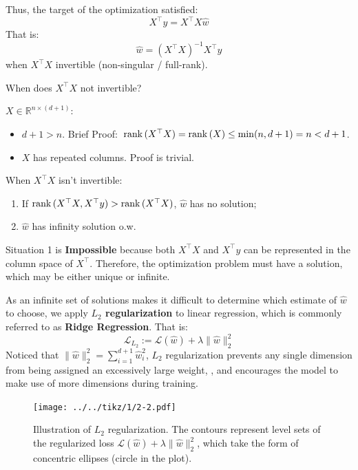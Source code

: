 \documentclass[../main]{subfiles}
\begin{document}
Thus, the target of the optimization satisfied:
\begin{equation}
    X^\top y=X^\top X\hat w
\end{equation}
That is:
\begin{equation}
    \hat w=(X^\top X)^{-1}X^\top y
\end{equation}
when $X^\top X$ invertible (non-singular / full-rank).
\begin{example}
  When does $X^\top X$ not invertible?
\end{example}
\begin{solution}
  $X\in \mathbb R^{n\times(d+1)}$:
\begin{itemize}
  \item $d+1>n.$ Brief Proof: $\, {\mathrm{rank}\,} (X^\top X)={\mathrm{rank}\,} (X)\le\min(n,d+1)=n<d+1$.
  \item $X$ has repeated columns. Proof is trivial.
\end{itemize}
\end{solution}

\vspace{1em}
When $X^\top X$ isn't invertible:
\begin{enumerate}
  \item If ${\mathrm{rank}\,} (X^\top X, X^\top y)>{\mathrm{rank}\,} (X^\top X)$, $\hat w$ has no solution; 
  \item $\hat w$ has infinity solution o.w.
\end{enumerate}
Situation 1 is \textbf{Impossible} because both $X^\top X$ and $X^\top y$ can be represented in the column space of $X^\top$. Therefore, the optimization problem must have a solution, which may be either unique or infinite.

As an infinite set of solutions makes it difficult to determine which estimate of $\hat w$ to choose, we apply \textbf{$L_2$ regularization} to linear regression, which is commonly referred to as \textbf{Ridge Regression}. That is:
\begin{equation}
    \mathcal L_{L_2}:=\mathcal L(\hat w)+\boxed{\lambda\|\hat w\|_2^2}
\end{equation}
Noticed that $\|\hat w\|_2^2=\sum_{i=1}^{d+1}\hat w_i^2$, $L_2$ regularization prevents any single dimension from being assigned an excessively large weight, , and encourages the model to make use of more dimensions during training.
\begin{figure}[H]
  \centering
  \texttt{[image: ../../tikz/1/2-2.pdf]}
  \caption{Illustration of $L_2$ regularization. 
The contours represent level sets of the regularized loss $\mathcal{L}(\hat w) + \lambda \|\hat w\|_2^2$, 
which take the form of concentric ellipses (circle in the plot). }
\end{figure}
\end{document}
